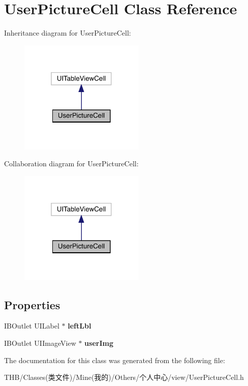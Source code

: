 \hypertarget{interface_user_picture_cell}{}\section{User\+Picture\+Cell Class Reference}
\label{interface_user_picture_cell}


Inheritance diagram for User\+Picture\+Cell\+:\nopagebreak
\begin{figure}[H]
\begin{center}
\leavevmode
\includegraphics[width=169pt]{interface_user_picture_cell__inherit__graph}
\end{center}
\end{figure}


Collaboration diagram for User\+Picture\+Cell\+:\nopagebreak
\begin{figure}[H]
\begin{center}
\leavevmode
\includegraphics[width=169pt]{interface_user_picture_cell__coll__graph}
\end{center}
\end{figure}
\subsection*{Properties}
\begin{DoxyCompactItemize}
\item 
\mbox{\label{interface_user_picture_cell_a8806e257ace6c06f64ee4986fe692bd4}} 
I\+B\+Outlet U\+I\+Label $\ast$ {\bfseries left\+Lbl}
\item 
\mbox{\label{interface_user_picture_cell_a369d2abb881f7614e26b4b91c7de2c89}} 
I\+B\+Outlet U\+I\+Image\+View $\ast$ {\bfseries user\+Img}
\end{DoxyCompactItemize}


The documentation for this class was generated from the following file\+:\begin{DoxyCompactItemize}
\item 
T\+H\+B/\+Classes(类文件)/\+Mine(我的)/\+Others/个人中心/view/User\+Picture\+Cell.\+h\end{DoxyCompactItemize}

